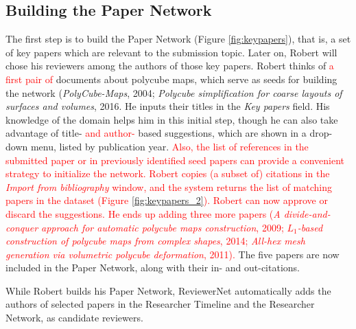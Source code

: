 \subsection*{Building the Paper Network} 
The first step is to build the Paper Network (Figure \ref{fig:keypapers}), that is, a set of key papers which are relevant to the submission topic. Later on, Robert will chose his reviewers among the authors of those key papers. Robert  thinks of \textcolor{red}{a first pair of} documents about polycube maps, which serve as seeds for building the network (\emph{PolyCube-Maps}, 2004; \emph{Polycube simplification for coarse layouts of surfaces and volumes}, 2016.  %
He inputs their titles in the \emph{Key papers} field. His knowledge of the domain helps him in this initial step, though he can also take advantage of title- \textcolor{red}{and author- }based suggestions, which are shown in a drop-down menu, listed by publication year. \textcolor{red}{Also, the list of references in the submitted paper or in previously identified seed papers can provide a convenient strategy to initialize the network. Robert copies (a subset of) citations in the \emph{Import from bibliography} window, and the system returns the list of matching papers in the dataset (Figure \ref{fig:keypapers_2}). Robert can now approve or discard the suggestions. He ends up adding three more papers (\emph{A divide-and-conquer approach for automatic polycube maps construction}, 2009; \emph{$L_1$-based construction of polycube maps from complex shapes}, 2014; \emph{All-hex mesh generation via volumetric polycube deformation}, 2011).} 
The five papers are now included in the Paper Network, along with their in- and out-citations. 
 
While Robert builds his Paper Network, ReviewerNet automatically adds the authors of selected papers in the Researcher Timeline and the Researcher Network, as candidate reviewers.

